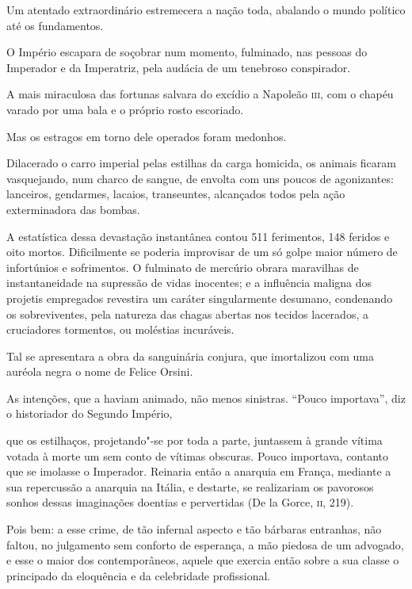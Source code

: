 Um atentado extraordinário
estremecera a nação toda, abalando o mundo político até os
fundamentos. 

O Império escapara de soçobrar num momento, fulminado, nas
pessoas do Imperador e da Imperatriz, pela audácia de um tenebroso
conspirador.

 A mais miraculosa das fortunas salvara do excídio a Napoleão \textsc{iii}, com o
chapéu varado por uma bala e o próprio rosto escoriado. 

Mas os estragos em torno dele operados foram medonhos. 

Dilacerado o carro imperial
pelas estilhas da carga homicida, os animais ficaram vasquejando, num
charco de sangue, de envolta com uns poucos de agonizantes: lanceiros,
gendarmes, lacaios, transeuntes, alcançados todos pela ação
exterminadora das bombas. 

A estatística dessa devastação instantânea
contou 511 ferimentos, 148 feridos e oito mortos. Dificilmente se
poderia improvisar de um só golpe maior número de infortúnios e
sofrimentos. O fulminato de mercúrio obrara maravilhas de
instantaneidade na supressão de vidas inocentes; e a influência maligna
dos projetis empregados revestira um caráter singularmente desumano,
condenando os sobreviventes, pela natureza das chagas abertas nos
tecidos lacerados, a cruciadores tormentos, ou moléstias incuráveis.

Tal se apresentara a obra da sanguinária conjura, que imortalizou com
uma auréola negra o nome de Felice Orsini. 

As intenções, que a haviam
animado, não menos sinistras. “Pouco importava”, diz o historiador do
Segundo Império, 

\begin{hedraquote}
que os estilhaços, projetando"-se por toda a parte,
juntassem à grande vítima votada à morte um sem conto de vítimas
obscuras. Pouco importava, contanto que se imolasse o Imperador.
Reinaria então a anarquia em França, mediante a sua repercussão a
anarquia na Itália, e destarte, se realizariam os pavorosos sonhos
dessas imaginações doentias e pervertidas (De la Gorce, \textsc{ii}, 219).
\end{hedraquote}

Pois bem: a esse crime, de tão infernal aspecto e tão bárbaras entranhas,
não faltou, no julgamento sem conforto de esperança, a mão piedosa de
um advogado, e esse o maior dos contemporâneos, aquele que exercia
então sobre a sua classe o principado da eloquência e da celebridade
profissional. 

